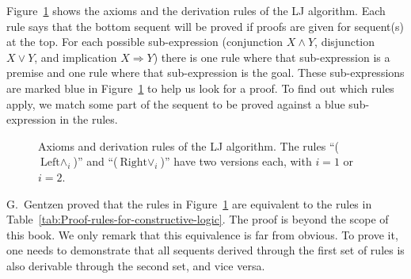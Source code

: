 Figure~\ref{fig:Rules-of-the-LJ-algorithm} shows the axioms and
the derivation rules of the LJ algorithm. Each rule says that the
bottom sequent will be proved if proofs are given for sequent(s) at
the top. For each possible sub-expression (conjunction $X\wedge Y$,
disjunction $X\vee Y$, and implication $X\Rightarrow Y$) there is
one rule where that sub-expression is a premise and one rule where
that sub-expression is the goal. These sub-expressions are marked
blue in Figure~\ref{fig:Rules-of-the-LJ-algorithm} to help us look
for a proof. To find out which rules apply, we match some part of
the sequent to be proved against a blue sub-expression in the rules.

\begin{figure}
\begin{centering}
\par\end{centering}
\caption{Axioms and derivation rules of the LJ algorithm. The rules \textquotedblleft ($\text{Left}\wedge_{i}$)\textquotedblright{}
and \textquotedblleft ($\text{Right}\vee_{i}$)\textquotedblright{}
have two versions each, with $i=1$ or $i=2$. \label{fig:Rules-of-the-LJ-algorithm}}
\end{figure}

G.~Gentzen proved that the rules in Figure~\ref{fig:Rules-of-the-LJ-algorithm}
are equivalent to the rules in Table~\ref{tab:Proof-rules-for-constructive-logic}.
The proof is beyond the scope of this book. We only remark that this
equivalence is far from obvious. To prove it, one needs to demonstrate
that all sequents derived through the first set of rules is also derivable
through the second set, and vice versa.

